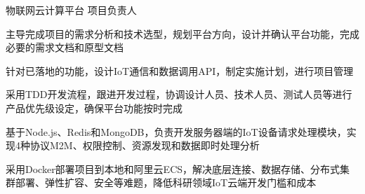 





\begin{cventries}


\cventry
{} %
{物联网云计算平台} %
{} %
{项目负责人} %
{ %
\begin{cvitems}
\item {主导完成项目的需求分析和技术选型，规划平台方向，设计并确认平台功能，完成必要的需求文档和原型文档}
\item {针对已落地的功能，设计IoT通信和数据调用API，制定实施计划，进行项目管理}
\item {采用TDD开发流程，跟进开发过程，协调设计人员、技术人员、测试人员等进行产品优先级设定，确保平台功能按时完成}
\item{基于Node.js、Redis和MongoDB，负责开发服务器端的IoT设备请求处理模块，实现4种协议M2M、权限控制、资源发现和数据即时处理分析}
\item{采用Docker部署项目到本地和阿里云ECS，解决底层连接、数据存储、分布式集群部署、弹性扩容、安全等难题，降低科研领域IoT云端开发门槛和成本}
\end{cvitems}
}


\end{cventries}


